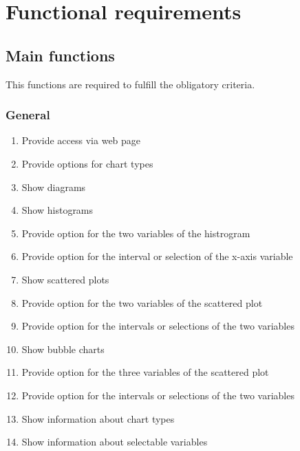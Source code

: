 \section{Functional requirements}

\renewcommand{\theenumi}{/F\arabic{enumi}0/}
\renewcommand{\labelenumi}{\theenumi}
 
\subsection{Main functions}

This functions are required to fulfill the obligatory criteria.
 
\subsubsection*{General} 
\begin{enumerate}
  
  \item Provide access via web page
    
  \item Provide options for chart types
  
  \item Show diagrams
  
  \item Show histograms %
  
  \item Provide option for the two variables of the histrogram
  
  \item Provide option for the interval or selection of the x-axis variable %
  
  \item Show scattered plots %
  
  \item Provide option for the two variables of the scattered plot
  
  \item Provide option for the intervals or selections of the two variables %
  
  \item Show bubble charts %
  
  \item Provide option for the three variables of the scattered plot
  
  \item Provide option for the intervals or selections of the two variables %
  
  \item Show information about chart types
  
  \item Show information about selectable variables
  
\end{enumerate}


